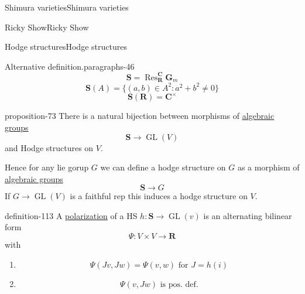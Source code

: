 \documentclass[10pt,]{book}
\numberwithin{equation}{section}
\newcommand{\RR}{\mathbf{R}}
\newcommand{\CC}{\mathbf{C}}
\DeclareMathOperator{\Res}{Res}
\DeclareMathOperator{\GL}{GL}
\begin{document}
\begin{chapterptx}{Shimura varieties}{}{Shimura varieties}{}{}
\begin{sectionptx}{Ricky Show}{}{Ricky Show}{}{}
\begin{subsectionptx}{Hodge structures}{}{Hodge structures}{}{}
\begin{paragraphs}{Alternative definition.}{paragraphs-46}%
\hypertarget{p-1148}{}%
%
\begin{equation*}
\mathbf S = \Res_\RR^\CC \mathbf G_m
\end{equation*}
%
\begin{equation*}
\mathbf S(A) = \{ (a,b) \in A^2 : a^2+  b^2 \ne 0\}
\end{equation*}
%
\begin{equation*}
\mathbf S(\RR) = \CC^\times
\end{equation*}
%
\begin{proposition}{}{}{proposition-73}%
\hypertarget{p-1149}{}%
There is  a natural bijection between morphisms of \hyperref[def-alg-gp]{algebraic groups}%
\begin{equation*}
\mathbf S \to \GL(V)
\end{equation*}
and Hodge structures on \(V\).%
\end{proposition}
\hypertarget{p-1150}{}%
Hence for any lie gorup \(G\) we can define a hodge structure on \(G\) as a morphism of \hyperref[def-alg-gp]{algebraic groups}%
\begin{equation*}
\mathbf S \to G
\end{equation*}
If \(G \to \GL(V)\) is a faithful rep this induces a hodge structure on \(V\).%
\begin{definition}{}{definition-113}%
\hypertarget{p-1151}{}%
A \hyperref[def-polarization]{polarization} of a HS \(h\colon \mathbf S \to \GL(v)\) is an alternating bilinear form%
\begin{equation*}
\Psi \colon V\times V \to \RR
\end{equation*}
with\leavevmode%
\begin{enumerate}
\item\hypertarget{li-281}{}%
\begin{equation*}
\Psi (Jv,Jw) =  \Psi(v,w) \text{ for } J = h(i)
\end{equation*}
%
\item\hypertarget{li-282}{}%
\begin{equation*}
\Psi(v,Jw) \text{ is pos. def.}
\end{equation*}
%
\end{enumerate}
%
\end{definition}
\end{paragraphs}%
\end{subsectionptx}
\end{sectionptx}
\end{chapterptx}
\end{document}
